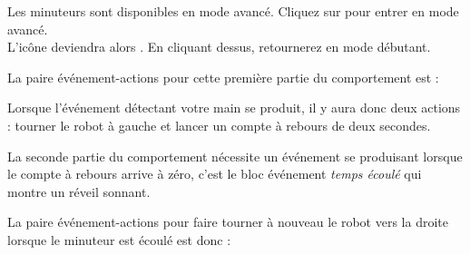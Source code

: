 {Les minuteurs sont disponibles en mode avancé.
Cliquez sur  pour entrer en mode avancé.\\
L'icône deviendra alors . En cliquant dessus, retournerez en mode débutant.}

La paire événement-actions pour cette première partie du comportement est : 

Lorsque l'événement détectant votre main se produit, il y aura donc deux actions : tourner le robot à gauche et lancer un compte à rebours de deux secondes.

La seconde partie du comportement nécessite un événement se produisant lorsque le compte à rebours arrive à zéro, c'est le bloc événement \emph{temps écoulé}  qui montre un réveil sonnant.

La paire événement-actions pour faire tourner à nouveau le robot vers la droite lorsque le minuteur est écoulé est donc : 

\bigskip



